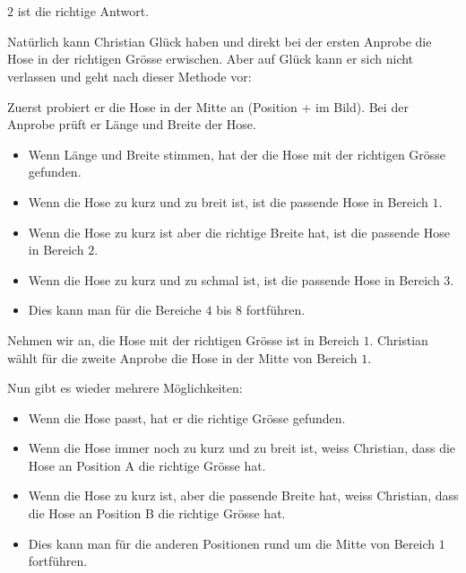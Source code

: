{{%
\section*{\BrochureSolution}
$2$ ist die richtige Antwort.

Natürlich kann Christian Glück haben und direkt bei der ersten Anprobe die Hose in der richtigen Grösse erwischen. Aber auf Glück kann er sich nicht verlassen und geht nach dieser Methode vor:

Zuerst probiert er die Hose in der Mitte an (Position + im Bild). Bei der Anprobe prüft er Länge und Breite der Hose.

\begin{itemize}
  \item Wenn Länge und Breite stimmen, hat der die Hose mit der richtigen Grösse gefunden.
  \item Wenn die Hose zu kurz und zu breit ist, ist die passende Hose in Bereich $1$.
  \item Wenn die Hose zu kurz ist aber die richtige Breite hat, ist die passende Hose in Bereich $2$.
  \item Wenn die Hose zu kurz und zu schmal ist, ist die passende Hose in Bereich $3$.
  \item Dies kann man für die Bereiche $4$ bis $8$ fortführen.
\end{itemize}

{\centering%
\par}

Nehmen wir an, die Hose mit der richtigen Grösse ist in Bereich $1$. Christian wählt für die zweite Anprobe die Hose in der Mitte von Bereich $1$.

Nun gibt es wieder mehrere Möglichkeiten:

\begin{itemize}
  \item Wenn die Hose passt, hat er die richtige Grösse gefunden.
  \item Wenn die Hose immer noch zu kurz und zu breit ist, weiss Christian, dass die Hose an Position A die richtige Grösse hat.
  \item Wenn die Hose zu kurz ist, aber die passende Breite hat, weiss Christian, dass die Hose an Position B die richtige Grösse hat.
  \item Dies kann man für die anderen Positionen rund um die Mitte von Bereich $1$ fortführen.
\end{itemize}

}}
